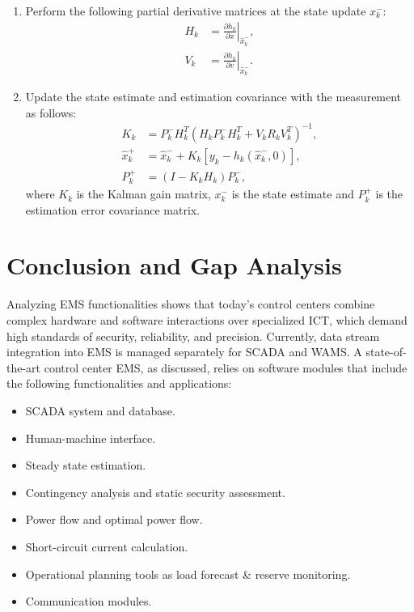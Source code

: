 \begin{enumerate}
    \item Perform the following partial derivative matrices at the state update ${x}_{k}^{-}$:
        \begin{equation}
        \begin{aligned}
        H_{k} & =\left.\frac{\partial h_{k}}{\partial x}\right|_{\hat{x}_{k}^{-}}, \\
        V_{k} & =\left.\frac{\partial h_{k}}{\partial v}\right|_{\hat{x}_{k}^{-}}.
        \end{aligned}
        \end{equation}

    \item Update the state estimate and estimation covariance with the measurement as follows:
        \begin{equation}
        \begin{aligned}
        K_{k} & =P_{k}^{-} H_{k}^{T}\left(H_{k} P_{k}^{-} H_{k}^{T}+V_{k} R_{k} V_{k}^{T}\right)^{-1}, \\
        \hat{x}_{k}^{+} & =\hat{x}_{k}^{-}+K_{k}\left[y_{k}-h_{k}\left(\hat{x}_{k}^{-}, 0\right)\right], \\
        P_{k}^{+} & =\left(I-K_{k} H_{k}\right) P_{k}^{-},
        \end{aligned}
        \end{equation}
    where $K_k$ is the Kalman gain matrix, ${x}_{k}^{-}$ is the state estimate and $P_{k}^{+}$ is the estimation error covariance matrix.
        
\end{enumerate}

\section{Conclusion and Gap Analysis}\label{sec:ch1/sec6}

Analyzing EMS functionalities shows that today's control centers combine complex hardware and software interactions over specialized ICT, which demand high standards of security, reliability, and precision. Currently, data stream integration into EMS is managed separately for SCADA and WAMS. A state-of-the-art control center EMS, as discussed, relies on software modules that include the following functionalities and applications:
\begin{itemize}
    \item SCADA system and database.
    \item Human-machine interface.
    \item Steady state estimation.
    \item Contingency analysis and static security assessment.
    \item Power flow and optimal power flow.
    \item Short-circuit current calculation.
    \item Operational planning tools as load forecast \& reserve monitoring.
    \item Communication modules.
\end{itemize}

